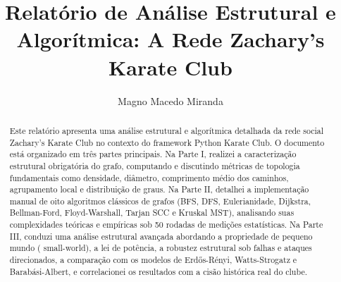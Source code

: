 \documentclass[sigconf]{webmedia}
\begin{document}
\title{Relatório de Análise Estrutural e Algorítmica: A Rede Zachary's Karate Club}

\author{Magno Macedo Miranda}

\renewcommand{\shortauthors}{Macedo}

\begin{abstract}
  Este relatório apresenta uma análise estrutural e algorítmica detalhada da rede social  {Zachary's Karate Club} no contexto do framework Python  {Karate Club}. O documento está organizado em três partes principais. Na Parte I, realizei a caracterização estrutural obrigatória do grafo, computando e discutindo métricas de topologia fundamentais como densidade, diâmetro, comprimento médio dos caminhos, agrupamento local e distribuição de graus. Na Parte II, detalhei a implementação manual de oito algoritmos clássicos de grafos (BFS, DFS, Eulerianidade, Dijkstra, Bellman-Ford, Floyd-Warshall, Tarjan SCC e Kruskal MST), analisando suas complexidades teóricas e empíricas sob 50 rodadas de medições estatísticas. Na Parte III, conduzi uma análise estrutural avançada abordando a propriedade de pequeno mundo ( {small-world}), a lei de potência, a robustez estrutural sob falhas e ataques direcionados, a comparação com os modelos de Erdős-Rényi, Watts-Strogatz e Barabási-Albert, e correlacionei os resultados com a cisão histórica real do clube.
\end{abstract}


\maketitle
\end{document}
